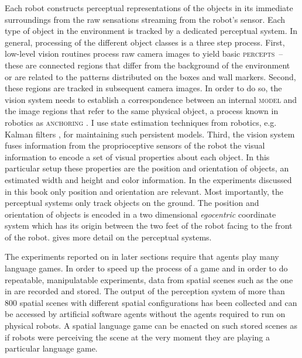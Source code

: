 Each robot constructs perceptual representations of the objects in its
immediate surroundings from the raw sensations streaming from the
robot's sensor. Each type of object in the environment is tracked
by a dedicated perceptual system. In general, processing of 
the different object classes is  a three step process.
First, low-level vision routines process raw camera
images to yield basic \textsc{percepts}~-- these are connected regions that
differ from the background of the environment or are related to 
the patterns distributed on the boxes and wall markers.
Second, these regions are tracked in subsequent
camera images. In order to do so, the vision system needs to establish a
correspondence between an internal \textsc{model} and the image
regions that refer to the same physical object, a process known in
robotics as \textsc{anchoring} \citep{coradeschi2003anchoring}. 
I use state estimation techniques from robotics, e.g. Kalman filters 
\citep{kalman1960linear}, 
for maintaining such persistent models. Third, the vision system 
fuses information from the proprioceptive sensors of the robot
the visual information to encode a set of visual properties about each object. 
In this particular setup these properties are the position and orientation of objects, 
an estimated width and height and color information. In the experiments 
discussed in this book only position and orientation are relevant. 
Most importantly, the perceptual systems only track objects on the ground. 
The position and orientation of objects is encoded in 
a two dimensional \emph{egocentric} coordinate system which has 
its origin between the two feet of the robot facing to the front of the 
robot. \cite{spranger2008grounded} gives more detail on the 
perceptual systems.

The experiments reported on in later sections require that agents play many
language games. In order to speed up the process of a game and in order to
do repeatable, manipulatable experiments, data from spatial scenes  such as the one 
in  are recorded and stored. The output of the perception
system of more than 800 spatial scenes with different spatial configurations 
has been collected and can be accessed by artificial software agents without 
the agents required to run on physical robots.
A spatial language game can be enacted on such stored scenes as if robots 
were perceiving the scene at the very moment they are playing a particular 
language game.

